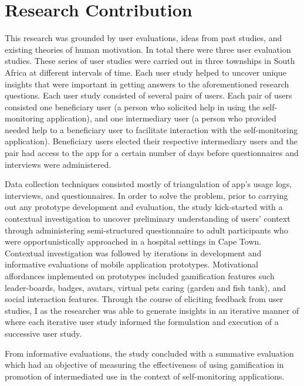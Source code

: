 \section{Research Contribution}
This research was grounded by user evaluations, ideas from past studies, and  existing theories of human motivation. In total there were three user evaluation studies. These series of user studies were carried out in three townships in South Africa at different intervals of time. Each user study helped to uncover unique insights that were important in getting answers to the aforementioned research questions. Each user study consisted of several pairs of users. Each pair of users consisted one beneficiary user (a person who solicited help in using the self-monitoring application), and one intermediary user (a person who provided needed help to a beneficiary user to facilitate interaction with the self-monitoring application). Beneficiary users elected their respective intermediary users and the pair had access to the app for a certain number of days before questionnaires and interviews were administered.  

Data collection techniques consisted mostly of triangulation of app's usage logs, interviews, and questionnaires. In order to solve the problem, prior to carrying out any prototype development and evaluation, the study kick-started with a contextual investigation to uncover preliminary understanding of users' context through administering semi-structured questionnaire to adult participants who were opportunistically approached in a hospital settings in Cape Town. Contextual investigation was followed by iterations in development and informative evaluations of mobile application prototypes. Motivational affordances implemented on prototypes included gamification features such leader-boards, badges, avatars, virtual pets caring (garden and fish tank), and social interaction features.  Through the course of eliciting feedback from user studies, I as the researcher was able to generate insights in an iterative manner of where each iterative user study informed the formulation and execution of a successive user study. 

From informative evaluations, the study concluded with a summative evaluation which had an objective of measuring the effectiveness of using gamification in promotion of intermediated use in the context of self-monitoring applications. 
 
